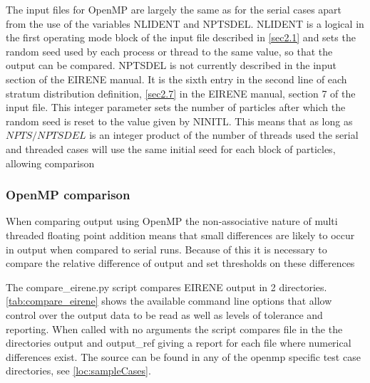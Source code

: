 The input files for OpenMP are largely the same as for the serial cases apart from the use of the variables {NLIDENT} and {NPTSDEL}. {NLIDENT} is a logical in the first operating mode block of the input file described in \cref{sec2.1} and sets the random seed used by each process or thread to the same value, so that the output can be compared. {NPTSDEL} is not currently described in the input section of the EIRENE manual. It is the sixth entry in the second line of each stratum distribution definition, \cref{sec2.7} in the EIRENE manual, section 7 of the input file. This integer parameter sets the number of particles after which the random seed is reset to the value given by {NINITL}. This means that as long as $NPTS/NPTSDEL$ is an integer product of the number of threads used the serial and threaded cases will use the same initial seed for each block of particles, allowing comparison


\subsubsection{OpenMP comparison}
When comparing output using OpenMP the non-associative nature of multi threaded floating point addition means that small differences are likely to occur in output when compared to serial runs. Because of this it is necessary to compare the relative difference of output and set thresholds on these differences

The {compare\_eirene.py} script compares EIRENE output in 2 directories. \cref{tab:compare_eirene} shows the available command line options that allow control over the output data to be read as well as levels of tolerance and reporting. When called with no arguments the script compares file in the the directories output and output\_ref giving a report for each file where numerical differences exist. The source can be found in any of the openmp specific test case directories, see \cref{loc:sampleCases}.

